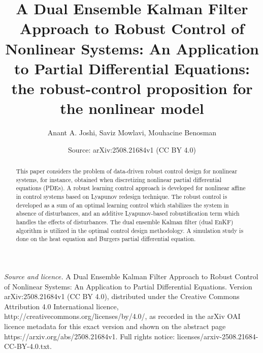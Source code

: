 \documentclass[10pt,a4paper]{amsart}
\title[A dual ensemble Kalman filter approach to robust control]{A Dual Ensemble Kalman Filter Approach to Robust Control of Nonlinear Systems: An Application to Partial Differential Equations: the robust-control proposition for the nonlinear model}
\author[Anant A. Joshi, Saviz Mowlavi, Mouhacine Benosman]{Anant A. Joshi, Saviz Mowlavi, Mouhacine Benosman}
\date{Source: arXiv:2508.21684v1 (CC BY 4.0)}
\begin{document}
\begin{abstract}
This paper considers the problem of data-driven robust control design for nonlinear systems, for instance, obtained when discretizing nonlinear partial differential equations (PDEs). A robust learning control approach is developed for nonlinear affine in control systems based on Lyapunov redesign technique. The robust control is developed as a sum of an optimal learning control which stabilizes the system in absence of disturbances, and an additive Lyapunov-based robustification term which handles the effects of disturbances. The dual ensemble Kalman filter (dual EnKF) algorithm is utilized in the optimal control design methodology. A simulation study is done on the heat equation and Burgers partial differential equation.
\end{abstract}
\maketitle

\noindent\emph{Source and licence.} A Dual Ensemble Kalman Filter Approach to Robust Control of Nonlinear Systems: An Application to Partial Differential Equations. Version arXiv:2508.21684v1 (CC BY 4.0), distributed under the Creative Commons Attribution 4.0 International licence, http://creativecommons.org/licenses/by/4.0/, as recorded in the arXiv OAI licence metadata for this exact version and shown on the abstract page https://arxiv.org/abs/2508.21684v1. Full rights notice: licenses/arxiv-2508.21684-CC-BY-4.0.txt.\par\smallskip
\end{document}
